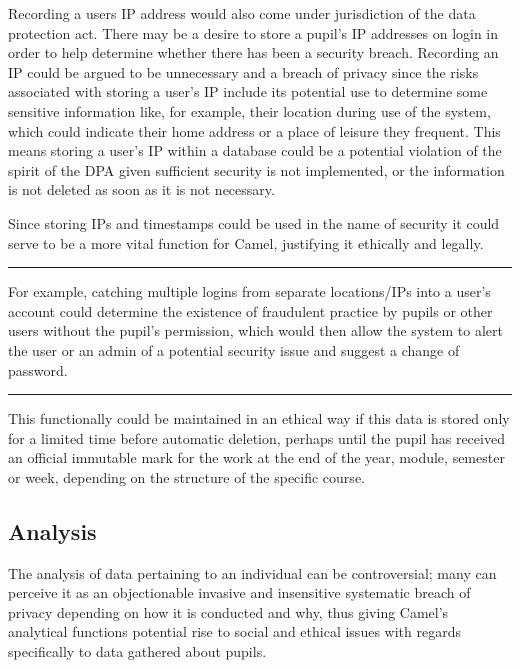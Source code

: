     Recording a users IP address would also come under jurisdiction of the data protection act. There may be a desire to store a pupil's IP addresses on login in order to help determine whether there has been a security breach. Recording an IP could be argued to be unnecessary and a breach of privacy since the risks associated with storing a user’s IP include its potential use to determine some sensitive information like, for example, their location during use of the system, which could indicate their home address or a place of leisure they frequent. This means storing a user’s IP within a database could be a potential violation of the spirit of the DPA given sufficient security is not implemented, or the information is not deleted as soon as it is not necessary.

    Since storing IPs and timestamps could be used in the name of security it could serve to be a more vital function for Camel, justifying it ethically and legally.

    \vspace{0.2cm}
    \hrule
    \begin{flushright}
        \scriptsize For example, catching multiple logins from separate locations/IPs into a user’s account could determine the existence of fraudulent practice by pupils or other users without the pupil’s permission, which would then allow the system to alert the user or an admin of a potential security issue and suggest a change of password.
    \end{flushright}
    \hrule
    \vspace{0.2cm}

    This functionally could be maintained in an ethical way if this data is stored only for a limited time before automatic deletion, perhaps until the pupil has received an official immutable mark for the work at the end of the year, module, semester or week, depending on the structure of the specific course.

    \subsection*{Analysis}
    The analysis of data pertaining to an individual can be controversial; many can perceive it as an objectionable invasive and insensitive systematic breach of privacy depending on how it is conducted and why, thus giving Camel’s analytical functions potential rise to social and ethical issues with regards specifically to data gathered about pupils.

